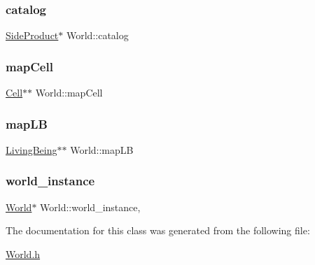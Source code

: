 \subsubsection{\texorpdfstring{catalog}{catalog}}
{\footnotesize\ttfamily \mbox{\hyperlink{classSideProduct}{Side\+Product}}$\ast$ World\+::catalog\hspace{0.3cm}{\ttfamily [protected]}}

\mbox{\label{classWorld_a829ccccee6dcf935cfb816c486c6cfa5}} 
\subsubsection{\texorpdfstring{mapCell}{mapCell}}
{\footnotesize\ttfamily \mbox{\hyperlink{classCell}{Cell}}$\ast$$\ast$ World\+::map\+Cell\hspace{0.3cm}{\ttfamily [protected]}}

\mbox{\label{classWorld_a6b4689eb19c90cc3ed3832585f5d1e91}} 
\subsubsection{\texorpdfstring{mapLB}{mapLB}}
{\footnotesize\ttfamily \mbox{\hyperlink{classLivingBeing}{Living\+Being}}$\ast$$\ast$ World\+::map\+LB\hspace{0.3cm}{\ttfamily [protected]}}

\mbox{\label{classWorld_aa19cb8336da15073b55b881ba2b33c64}} 
\subsubsection{\texorpdfstring{world\_instance}{world\_instance}}
{\footnotesize\ttfamily \mbox{\hyperlink{classWorld}{World}}$\ast$ World\+::world\+\_\+instance\hspace{0.3cm}{\ttfamily [static]}, {\ttfamily [protected]}}



The documentation for this class was generated from the following file\+:\begin{DoxyCompactItemize}
\item 
\mbox{\hyperlink{World_8h}{World.\+h}}\end{DoxyCompactItemize}
